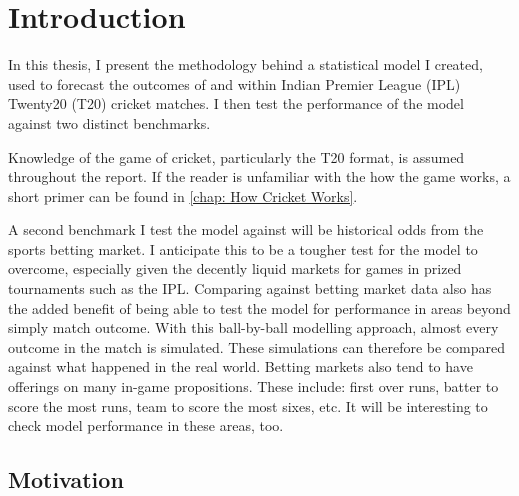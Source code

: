 \newcommand{\hsp}{\hspace{20pt}}
\titleformat{\chapter}[hang]{\Huge\bfseries}{\thechapter\hsp\textcolor{gray75}{|}\hsp}{0pt}{\Huge\bfseries}
\chapter{Introduction}


In this thesis, I present the methodology behind a statistical model I created, used to forecast the outcomes of and within\footnotemark{} Indian Premier League (IPL) Twenty20 (T20) cricket matches. I then test the performance of the model against two distinct benchmarks.


Knowledge of the game of cricket, particularly the T20 format, is assumed throughout the report. If the reader is unfamiliar with the how the game works, a short primer can be found in \autoref{chap: How Cricket Works}.

A second benchmark I test the model against will be historical odds from the sports betting market. I anticipate this to be a tougher test for the model to overcome, especially given the decently liquid markets\footnotemark{} for games in prized tournaments such as the IPL. Comparing against betting market data also has the added benefit of being able to test the model for performance in areas beyond simply match outcome. With this ball-by-ball modelling approach, almost every outcome in the match is simulated. These simulations can therefore be compared against what happened in the real world. Betting markets also tend to have offerings on many in-game propositions. These include: first over runs, batter to score the most runs, team to score the most sixes, etc. It will be interesting to check model performance in these areas, too.


\section{Motivation}

